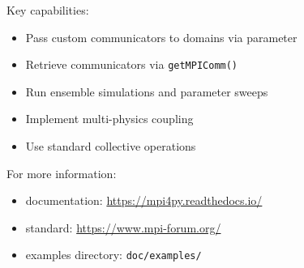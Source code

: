 Key capabilities:
\begin{itemize}
\item Pass custom communicators to domains via  parameter
\item Retrieve communicators via \texttt{getMPIComm()}
\item Run ensemble simulations and parameter sweeps
\item Implement multi-physics coupling
\item Use standard \MPI collective operations
\end{itemize}

For more information:
\begin{itemize}
\item \mpifo documentation: \url{https://mpi4py.readthedocs.io/}
\item \MPI standard: \url{https://www.mpi-forum.org/}
\item \escript examples directory: \texttt{doc/examples/}
\end{itemize}
